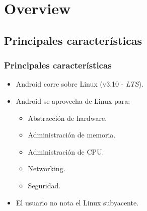 \section{Overview}

\subsection{Principales características}
\begin{frame}
  \frametitle{Principales características}
  \begin{itemize}
    \item Android corre sobre Linux (v3.10 - \textit{LTS}).
    
    \item Android se aprovecha de Linux para:
      \begin{itemize}
  \item Abstracción de hardware.
  \item Administración de memoria.
  \item Administración de CPU.
  \item Networking.
  \item Seguridad.
      \end{itemize}
    
    \item El usuario no nota el Linux subyacente.
  \end{itemize}
\end{frame}


